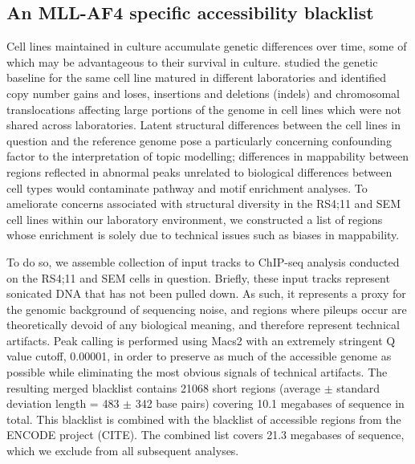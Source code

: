 \subsection{An MLL-AF4 specific accessibility blacklist} \label{mll_blacklist}

Cell lines maintained in culture accumulate genetic differences over time, some of which may be advantageous to their survival in culture. \cite{Liu2019}\textcite{Ben-David2018} studied the genetic baseline for the same cell line matured in different laboratories and identified copy number gains and loses, insertions and deletions (indels) and chromosomal translocations affecting large portions of the genome in cell lines which were not shared across laboratories. Latent structural differences between the cell lines in question and the reference genome pose a particularly concerning confounding factor to the interpretation of topic modelling; differences in mappability between regions reflected in abnormal peaks unrelated to biological differences between cell types would contaminate pathway and motif enrichment analyses. To ameliorate concerns associated with structural diversity in the RS4;11 and SEM cell lines within our laboratory environment, we constructed a list of regions whose enrichment is solely due to technical issues such as biases in mappability.

To do so, we assemble collection of input tracks to ChIP-seq analysis conducted on the RS4;11 and SEM cells in question. Briefly, these input tracks represent sonicated DNA that has not been pulled down. As such, it represents a proxy for the genomic background of sequencing noise, and regions where pileups occur are theoretically devoid of any biological meaning, and therefore represent technical artifacts. Peak calling is performed using Macs2 with an extremely stringent Q value cutoff, 0.00001, in order to preserve as much of the accessible genome as possible while eliminating the most obvious signals of technical artifacts. The resulting merged blacklist contains 21068 short regions (average $\pm$ standard deviation length = 483 $\pm$ 342 base pairs) covering 10.1 megabases of sequence in total. This blacklist is combined with the blacklist of accessible regions from the ENCODE project (CITE). The combined list covers 21.3 megabases of sequence, which we exclude from all subsequent analyses.

